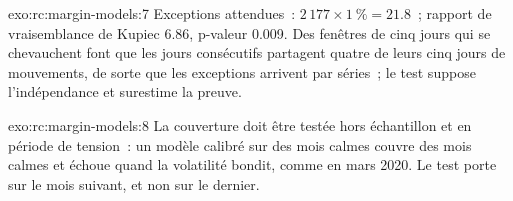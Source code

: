 \begin{solution}{exo:rc:margin-models:7}
Exceptions attendues~: $2\,177\times1~\% = 21.8$~; rapport de vraisemblance de Kupiec 6.86, p-valeur 0.009. Des fenêtres de cinq jours qui se chevauchent font que
les jours consécutifs partagent quatre de leurs cinq jours de mouvements, de sorte que les exceptions arrivent par séries~; le test suppose
l'indépendance et surestime la preuve.
\end{solution}

\begin{solution}{exo:rc:margin-models:8}
La couverture doit être testée hors échantillon et en période de tension~: un modèle calibré sur des mois calmes couvre des mois calmes
et échoue quand la volatilité bondit, comme en mars 2020. Le test porte sur le mois suivant, et non sur le dernier.
\end{solution}

